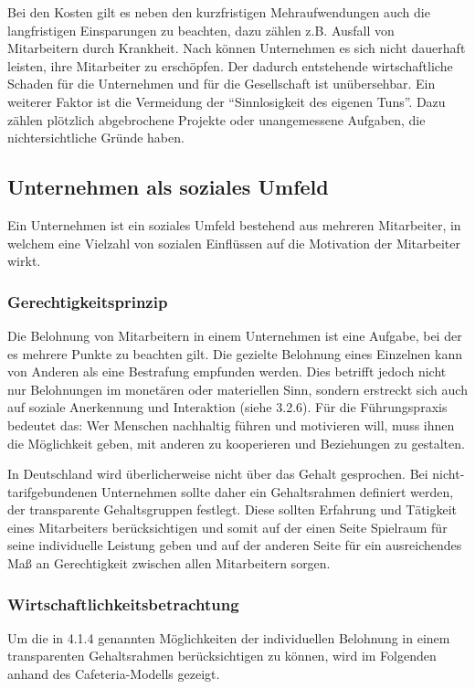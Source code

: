 Bei den Kosten gilt es neben den kurzfristigen Mehraufwendungen auch die langfristigen Einsparungen zu beachten, dazu zählen z.B. Ausfall von Mitarbeitern durch Krankheit. Nach \citet{Schlolaut.2013} können Unternehmen es sich nicht dauerhaft leisten, ihre Mitarbeiter zu erschöpfen. Der dadurch entstehende wirtschaftliche Schaden für die Unternehmen und für die Gesellschaft ist unübersehbar. Ein weiterer Faktor ist die Vermeidung der “Sinnlosigkeit des eigenen Tuns”. Dazu zählen plötzlich abgebrochene Projekte oder unangemessene Aufgaben, die nichtersichtliche Gründe haben.

\subsection{Unternehmen als soziales Umfeld}
Ein Unternehmen ist ein soziales Umfeld bestehend aus mehreren Mitarbeiter, in welchem eine Vielzahl von sozialen Einflüssen auf die Motivation der Mitarbeiter wirkt. 

\subsubsection{Gerechtigkeitsprinzip}
Die Belohnung von Mitarbeitern in einem Unternehmen ist eine Aufgabe, bei der es mehrere Punkte zu beachten gilt. Die gezielte Belohnung eines Einzelnen kann von Anderen als eine Bestrafung empfunden werden. Dies betrifft jedoch nicht nur Belohnungen im monetären oder materiellen Sinn, sondern erstreckt sich auch auf soziale Anerkennung und Interaktion (siehe 3.2.6). \glqq Für die Führungspraxis bedeutet das: Wer Menschen nachhaltig führen und motivieren will, muss ihnen die Möglichkeit geben, mit anderen zu kooperieren und Beziehungen zu gestalten.\grqq \cite[S. 18]{Seelbach.2011} 

In Deutschland wird überlicherweise nicht über das Gehalt gesprochen. Bei nicht-tarifgebundenen Unternehmen sollte daher ein Gehaltsrahmen definiert werden, der transparente Gehaltsgruppen festlegt. Diese sollten Erfahrung und Tätigkeit eines Mitarbeiters berücksichtigen und somit auf der einen Seite Spielraum für seine individuelle Leistung geben und auf der anderen Seite für ein ausreichendes Maß an Gerechtigkeit zwischen allen Mitarbeitern sorgen. 

\subsubsection{Wirtschaftlichkeitsbetrachtung}
Um die in 4.1.4 genannten Möglichkeiten der individuellen Belohnung in einem transparenten Gehaltsrahmen berücksichtigen zu können, wird im Folgenden anhand des Cafeteria-Modells gezeigt.

